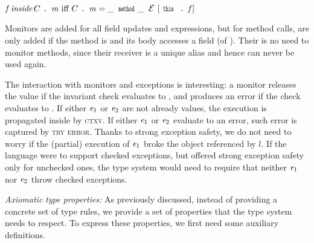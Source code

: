 $%
\f\, \textit{inside}\, C\singleDot\m\text{ iff }
C\singleDot\m=\_\,\Kw{method}\_\,\ctx[\Kw{this}\singleDot\f]
$


Monitors are added for all field updates and \Q@new@ expressions, but
for method calls, are only added if the method is \Q@mut@ and its body accesses a \Q@capsule@ field (of \Q@this@).
Their is no need to monitor \Q@capsule@ methods, since their receiver is a unique alias and hence can never be used again.

The interaction with monitors and exceptions is interesting:
a monitor releases the value if the invariant check evaluates to \Q@true@, and produces an error if the 
check evaluates to \Q@false@.
If either ${\mathit{e}}_1$ or ${\mathit{e}}_2$ are not already values, the execution is propagated inside
by \textsc{ctxv}.
If either ${\mathit{e}}_1$ or ${\mathit{e}}_2$ evaluate to an error, such error is captured by 
\textsc{try error}.
Thanks to strong exception safety,
we do not need to worry
if the (partial) execution of ${\mathit{e}}_1$ broke the object referenced by $l$.
If the language were to support checked exceptions, but offered 
strong exception safety only for unchecked ones,
the type system would need to require that neither ${\mathit{e}}_1$ nor ${\mathit{e}}_2$ throw
checked exceptions.








\loseSpace
\textit{Axiomatic type properties:}
As previously discussed, instead of providing a concrete set of type rules, we provide a set of properties
that the type system needs to respect.
To express these properties, we first need some auxiliary definitions.


